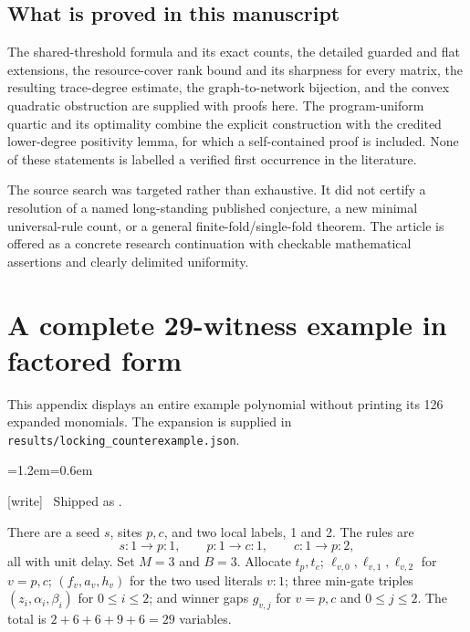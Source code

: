 \documentclass[11pt,letterpaper]{article}
\theoremstyle{definition}
\theoremstyle{remark}
\newcommand{\code}[1]{\nolinkurl{#1}}
\newcommand{\wtag}{\textup{[write]}}
\newenvironment{writenote}{\par\smallskip\begin{list}{}{\leftmargin=1.2em\rightmargin=0.6em}\item[]\small\wtag\ }{\end{list}\smallskip}
\begin{document}
\subsection{What is proved in this manuscript}
The shared-threshold formula and its exact counts, the detailed guarded
and flat extensions, the resource-cover rank bound and its sharpness for
every matrix, the resulting trace-degree estimate, the graph-to-network
bijection, and the convex quadratic obstruction are supplied with proofs
here. The program-uniform quartic and its optimality combine the explicit
construction with the credited lower-degree positivity lemma, for which a
self-contained proof is included. None of these statements is labelled a
verified first occurrence in the literature.

The source search was targeted rather than exhaustive. It did not certify
a resolution of a named long-standing published conjecture, a new minimal
universal-rule count, or a general finite-fold/single-fold theorem. The
article is offered as a concrete research continuation with checkable
mathematical assertions and clearly delimited uniformity.


\section{A complete 29-witness example in factored form}\label{qoc:ts:app:example}
This appendix displays an entire example polynomial without printing its
126 expanded monomials. The expansion is supplied in
\code{results/locking_counterexample.json}.

\begin{writenote}
Shipped as .
\end{writenote}

There are a seed $s$, sites $p,c$, and two local labels, 1 and 2. The rules
are
\[
 s:1\to p:1,\qquad p:1\to c:1,\qquad c:1\to p:2,
\]
all with unit delay. Set $M=3$ and $B=3$. Allocate $t_p,t_c$;
$\ell_{v,0},\ell_{v,1},\ell_{v,2}$ for $v=p,c$;
$(f_v,a_v,h_v)$ for the two used literals $v:1$;
three min-gate triples $(z_i,\alpha_i,\beta_i)$ for $0\le i\le2$;
and winner gaps $g_{v,j}$ for $v=p,c$ and $0\le j\le2$.
The total is $2+6+6+9+6=29$ variables.
\end{document}
